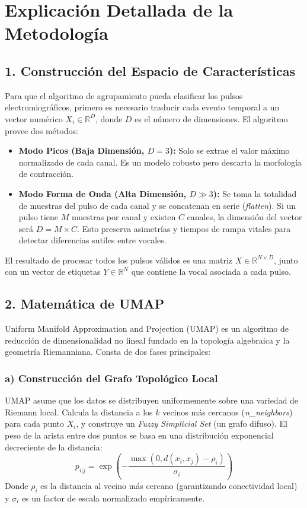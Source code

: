 \documentclass[12pt, a4paper]{article}
\begin{document}
\newpage

\section{Explicación Detallada de la Metodología}

\subsection{1. Construcción del Espacio de Características}
Para que el algoritmo de agrupamiento pueda clasificar los pulsos electromiográficos, primero es necesario traducir cada evento temporal a un vector numérico $X_i \in \mathbb{R}^D$, donde $D$ es el número de dimensiones. El algoritmo provee dos métodos:
\begin{itemize}
    \item \textbf{Modo Picos (Baja Dimensión, $D=3$):} Solo se extrae el valor máximo normalizado de cada canal. Es un modelo robusto pero descarta la morfología de contracción.
    \item \textbf{Modo Forma de Onda (Alta Dimensión, $D \gg 3$):} Se toma la totalidad de muestras del pulso de cada canal y se concatenan en serie (\textit{flatten}). Si un pulso tiene $M$ muestras por canal y existen $C$ canales, la dimensión del vector será $D = M \times C$. Esto preserva asimetrías y tiempos de rampa vitales para detectar diferencias sutiles entre vocales.
\end{itemize}
El resultado de procesar todos los pulsos válidos es una matriz $X \in \mathbb{R}^{N \times D}$, junto con un vector de etiquetas $Y \in \mathbb{R}^N$ que contiene la vocal asociada a cada pulso.

\subsection{2. Matemática de UMAP}
Uniform Manifold Approximation and Projection (UMAP) es un algoritmo de reducción de dimensionalidad no lineal fundado en la topología algebraica y la geometría Riemanniana. Consta de dos fases principales:

\subsubsection{a) Construcción del Grafo Topológico Local}
UMAP asume que los datos se distribuyen uniformemente sobre una variedad de Riemann local. Calcula la distancia a los $k$ vecinos más cercanos (\textit{n\_neighbors}) para cada punto $X_i$, y construye un \textit{Fuzzy Simplicial Set} (un grafo difuso). El peso de la arista entre dos puntos se basa en una distribución exponencial decreciente de la distancia:
\[
p_{i|j} = \exp\left(-\frac{\max(0, d(x_i, x_j) - \rho_i)}{\sigma_i}\right)
\]
Donde $\rho_i$ es la distancia al vecino más cercano (garantizando conectividad local) y $\sigma_i$ es un factor de escala normalizado empíricamente.
\end{document}
